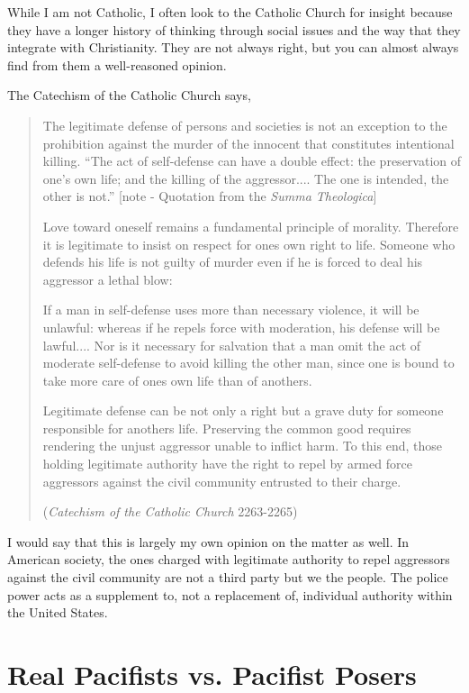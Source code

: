While I am not Catholic, I often look to the Catholic Church for insight
because they have a longer history of thinking through social issues
and the way that they integrate with Christianity. They are not always
right, but you can almost always find from them a well-reasoned
opinion.

The Catechism of the Catholic Church says, 

\begin{quote}
The legitimate defense of persons and societies is not an exception to
the prohibition against the murder of the innocent that constitutes
intentional killing. ``The act of self-defense can have a
double effect: the preservation of one's own life; and
the killing of the aggressor.... The one is intended, the other is
not.'' [note - Quotation from the \textit{Summa
Theologica}]

Love toward oneself remains a fundamental principle of morality.
Therefore it is legitimate to insist on respect for
one{\textquotesingle}s own right to life. Someone who defends his life
is not guilty of murder even if he is forced to deal his aggressor a
lethal blow: 

If a man in self-defense uses more than necessary violence, it will be
unlawful: whereas if he repels force with moderation, his defense will
be lawful.... Nor is it necessary for salvation that a man omit the act
of moderate self-defense to avoid killing the other man, since one is
bound to take more care of one{\textquotesingle}s own life than of
another{\textquotesingle}s.

Legitimate defense can be not only a right but a grave duty for someone
responsible for another{\textquotesingle}s life. Preserving the common
good requires rendering the unjust aggressor unable to inflict harm. To
this end, those holding legitimate authority have the right to repel by
armed force aggressors against the civil community entrusted to their
charge.

(\textit{Catechism of the Catholic Church} 2263-2265) 
\end{quote}

I would say that this is largely my own opinion on the matter as well.
In American society, the ones charged with legitimate authority to
repel aggressors against the civil community
are not a third party
but we the people. The police power acts as a supplement to, not a
replacement of, individual authority within the United States.

\section{Real Pacifists vs. Pacifist Posers}


